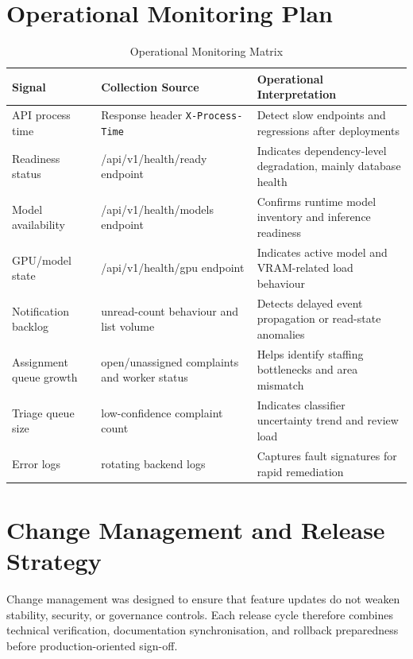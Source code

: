 \section{Operational Monitoring Plan}

\begin{table}[H]
\centering
\begin{tabularx}{\textwidth}{|>{\RaggedRight\arraybackslash}p{}|>{\RaggedRight\arraybackslash}p{}|>{\RaggedRight\arraybackslash}X|}
\hline
\textbf{Signal} & \textbf{Collection Source} & \textbf{Operational Interpretation} \\ \hline
API process time & Response header \texttt{X-Process-Time} & Detect slow endpoints and regressions after deployments \\ \hline
Readiness status & /api/v1/health/ready endpoint & Indicates dependency-level degradation, mainly database health \\ \hline
Model availability & /api/v1/health/models endpoint & Confirms runtime model inventory and inference readiness \\ \hline
GPU/model state & /api/v1/health/gpu endpoint & Indicates active model and VRAM-related load behaviour \\ \hline
Notification backlog & unread-count behaviour and list volume & Detects delayed event propagation or read-state anomalies \\ \hline
Assignment queue growth & open/unassigned complaints and worker status & Helps identify staffing bottlenecks and area mismatch \\ \hline
Triage queue size & low-confidence complaint count & Indicates classifier uncertainty trend and review load \\ \hline
Error logs & rotating backend logs & Captures fault signatures for rapid remediation \\ \hline
\end{tabularx}
\captionsetup{position=bottom}
\caption{Operational Monitoring Matrix}
\end{table}

\section{Change Management and Release Strategy}

Change management was designed to ensure that feature updates do not weaken stability, security, or governance controls. Each release cycle therefore combines technical verification, documentation synchronisation, and rollback preparedness before production-oriented sign-off.

